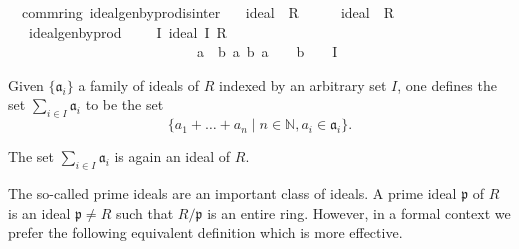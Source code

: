 \documentclass[12pt]{scrartcl}
\begin{document}
\begin{isabelle}
\isamarkupfalse%
\ {\isacharparenleft}{\kern0pt}\ comm{\isacharunderscore}{\kern0pt}ring{\isacharparenright}{\kern0pt}\ ideal{\isacharunderscore}{\kern0pt}gen{\isacharunderscore}{\kern0pt}by{\isacharunderscore}{\kern0pt}prod{\isacharunderscore}{\kern0pt}is{\isacharunderscore}{\kern0pt}inter{\isacharcolon}{\kern0pt}\isanewline
\ \ \ {\isachardoublequoteopen}ideal\ {\isasymaa}\ R\ {\isacharparenleft}{\kern0pt}{\isacharplus}{\kern0pt}{\isacharparenright}{\kern0pt}\ {\isacharparenleft}{\kern0pt}{\isasymcdot}{\isacharparenright}{\kern0pt}\ {\isasymzero}\ {\isasymone}{\isachardoublequoteclose}\ \ {\isachardoublequoteopen}ideal\ {\isasymbb}\ R\ {\isacharparenleft}{\kern0pt}{\isacharplus}{\kern0pt}{\isacharparenright}{\kern0pt}\ {\isacharparenleft}{\kern0pt}{\isasymcdot}{\isacharparenright}{\kern0pt}\ {\isasymzero}\ {\isasymone}{\isachardoublequoteclose}\isanewline
\ \ \ {\isachardoublequoteopen}ideal{\isacharunderscore}{\kern0pt}gen{\isacharunderscore}{\kern0pt}by{\isacharunderscore}{\kern0pt}prod\ {\isasymaa}\ {\isasymbb}\ {\isacharequal}{\kern0pt}\ {\isasymInter}\ {\isacharbraceleft}{\kern0pt}I{\isachardot}{\kern0pt}\ ideal\ I\ R\ {\isacharparenleft}{\kern0pt}{\isacharplus}{\kern0pt}{\isacharparenright}{\kern0pt}\ {\isacharparenleft}{\kern0pt}{\isasymcdot}{\isacharparenright}{\kern0pt}\ {\isasymzero}\ {\isasymone}\ \isanewline
\ \ \ \ \ \ \ \ \ \ \ \ \ \ \ \ \ \ \ \ \ \ \ \ \ \ {\isasymand}\ {\isacharbraceleft}{\kern0pt}a\ {\isasymcdot}\ b\ {\isacharbar}{\kern0pt}a\ b{\isachardot}{\kern0pt}\ a\ {\isasymin}\ {\isasymaa}\ {\isasymand}\ b\ {\isasymin}\ {\isasymbb}{\isacharbraceright}{\kern0pt}\ {\isasymsubseteq}\ I{\isacharbraceright}{\kern0pt}{\isachardoublequoteclose}
\end{isabelle}

Given $\lbrace \mathfrak{a}_i \rbrace$ a family of ideals of $R$ indexed by an arbitrary set $I$, one defines the set $\displaystyle \sum_{i \in I} \mathfrak{a}_i$ to be the set 
	\[
	\lbrace a_1 + \dots + a_n \mid n \in \mathbb{N}, a_i \in \mathfrak{a}_i \rbrace .
	\]

The set $\displaystyle \sum_{i \in I} \mathfrak{a}_i$ is again an ideal of $R$.	

The so-called prime ideals are an important class of ideals. A prime ideal $\mathfrak{p}$ of $R$ is an ideal $\mathfrak{p} \neq R$ such that $R/\mathfrak{p}$ is an entire ring. However, in a formal context we prefer the following equivalent definition which is more effective.
\end{document}
